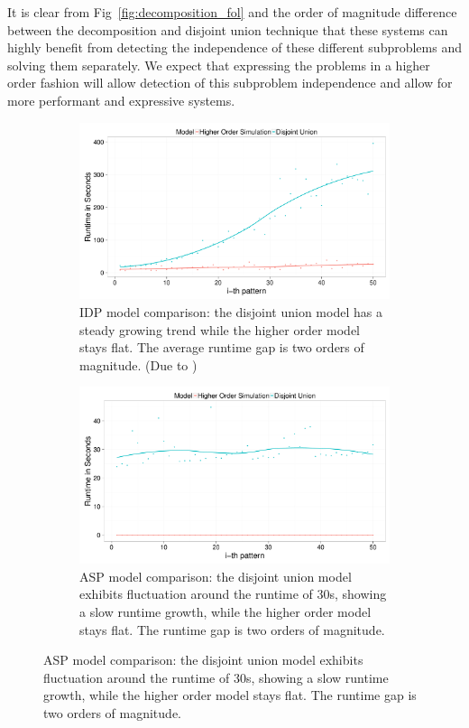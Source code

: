 It is clear from Fig~\ref{fig:decomposition_fol} and the order of magnitude difference between the decomposition and disjoint union technique that these systems can highly benefit from detecting the independence of these different subproblems and solving them separately.
We expect that expressing the problems in a higher order fashion will allow detection of this subproblem independence and allow for more performant and expressive systems.
\begin{figure}[h]
\centering
\begin{subfigure}{.44\textwidth}
  \centering
\includegraphics[scale=0.14]{extra/figure_comparison_yoshida.pdf}
\caption{\footnotesize{IDP model comparison: the disjoint union model has a steady growing trend while the higher order model stays flat. The average runtime gap is two orders of magnitude. (Due to \cite{ilp_graph_mining})}}
  \label{fig:decomposition_idp}
\end{subfigure}%
\hfill
\begin{subfigure}{0.46\textwidth}
  \centering
 \includegraphics[scale=0.14]{extra/asp_fol_vs_decomposed_yoshida.pdf}
 \caption{\footnotesize{ASP model comparison: the disjoint union model exhibits fluctuation around the runtime of 30s, showing a slow runtime growth, while the higher order model stays flat. The runtime gap is two orders of magnitude.}}

\end{subfigure}
\end{figure}
